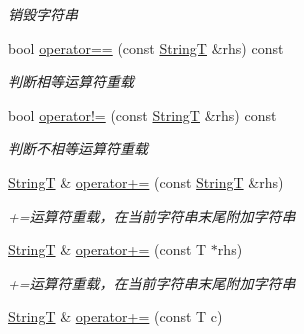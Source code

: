 \begin{DoxyCompactItemize}
\begin{DoxyCompactList}\small\item\em 销毁字符串 \end{DoxyCompactList}\item 
\hypertarget{class_util_1_1_string_t_ae7f2518a479e1d2eab801c61161b6c16}{bool \hyperlink{class_util_1_1_string_t_ae7f2518a479e1d2eab801c61161b6c16}{operator==} (const \hyperlink{class_util_1_1_string_t}{String\-T} \&rhs) const }\label{class_util_1_1_string_t_ae7f2518a479e1d2eab801c61161b6c16}

\begin{DoxyCompactList}\small\item\em 判断相等运算符重载 \end{DoxyCompactList}\item 
\hypertarget{class_util_1_1_string_t_a47bccc96e9e30396c77aa9a7fce55075}{bool \hyperlink{class_util_1_1_string_t_a47bccc96e9e30396c77aa9a7fce55075}{operator!=} (const \hyperlink{class_util_1_1_string_t}{String\-T} \&rhs) const }\label{class_util_1_1_string_t_a47bccc96e9e30396c77aa9a7fce55075}

\begin{DoxyCompactList}\small\item\em 判断不相等运算符重载 \end{DoxyCompactList}\item 
\hypertarget{class_util_1_1_string_t_a462a60b09841d50708bdeeb7581fe820}{\hyperlink{class_util_1_1_string_t}{String\-T} \& \hyperlink{class_util_1_1_string_t_a462a60b09841d50708bdeeb7581fe820}{operator+=} (const \hyperlink{class_util_1_1_string_t}{String\-T} \&rhs)}\label{class_util_1_1_string_t_a462a60b09841d50708bdeeb7581fe820}

\begin{DoxyCompactList}\small\item\em +=运算符重载，在当前字符串末尾附加字符串 \end{DoxyCompactList}\item 
\hypertarget{class_util_1_1_string_t_af4676243dd3164991f3f03687bea8763}{\hyperlink{class_util_1_1_string_t}{String\-T} \& \hyperlink{class_util_1_1_string_t_af4676243dd3164991f3f03687bea8763}{operator+=} (const T $\ast$rhs)}\label{class_util_1_1_string_t_af4676243dd3164991f3f03687bea8763}

\begin{DoxyCompactList}\small\item\em +=运算符重载，在当前字符串末尾附加字符串 \end{DoxyCompactList}\item 
\hypertarget{class_util_1_1_string_t_ae7c4ebe35e01d31dc597f10ceab4d2e6}{\hyperlink{class_util_1_1_string_t}{String\-T} \& \hyperlink{class_util_1_1_string_t_ae7c4ebe35e01d31dc597f10ceab4d2e6}{operator+=} (const T c)}\label{class_util_1_1_string_t_ae7c4ebe35e01d31dc597f10ceab4d2e6}


\end{DoxyCompactItemize}
